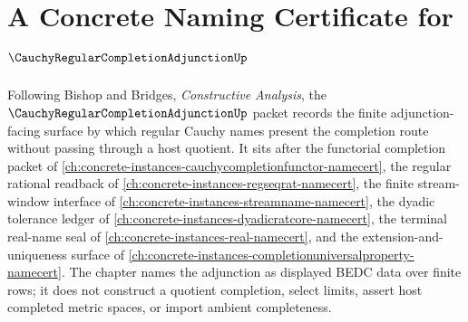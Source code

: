 \chapter{A Concrete Naming Certificate for $\CauchyRegularCompletionAdjunctionUp$}
\label{ch:concrete-instances-cauchy-regular-completion-adjunction-namecert}

Following Bishop and Bridges, \emph{Constructive Analysis}, the $\CauchyRegularCompletionAdjunctionUp$ packet records the finite adjunction-facing surface by which regular Cauchy names present the completion route without passing through a host quotient. It sits after the functorial completion packet of \autoref{ch:concrete-instances-cauchycompletionfunctor-namecert}, the regular rational readback of \autoref{ch:concrete-instances-regseqrat-namecert}, the finite stream-window interface of \autoref{ch:concrete-instances-streamname-namecert}, the dyadic tolerance ledger of \autoref{ch:concrete-instances-dyadicratcore-namecert}, the terminal real-name seal of \autoref{ch:concrete-instances-real-namecert}, and the extension-and-uniqueness surface of \autoref{ch:concrete-instances-completionuniversalproperty-namecert}. The chapter names the adjunction as displayed BEDC data over finite rows; it does not construct a quotient completion, select limits, assert host completed metric spaces, or import ambient completeness.

